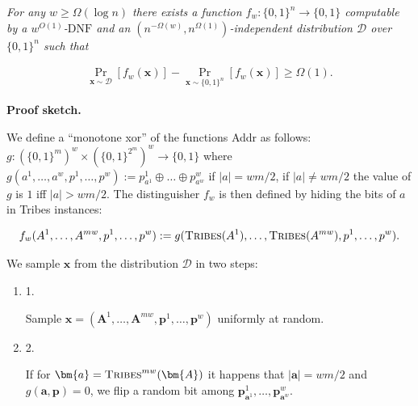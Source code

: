 \emph{For any $w\geq\Omega(\log n)$ there exists a function $f_{w}\colon\{0,1\}^{n}\to\{0,1\}$ computable by a
$w^{O(1)}$-$\mathrm{DNF}$ and an $(n^{-\Omega(w)},n^{\Omega(1)})$-independent distribution $\mathcal{D}$ over
$\{0,1\}^{n}$ such that}\par


\[\begin{gathered}
\Pr_{\bm{x}\sim\mathcal{D}}[f_{w}(\bm{x})]-\Pr_{\bm{x}\sim\{0,1\}^{n}}[f_{w}(\bm{x})]\geq\Omega(1).
\end{gathered}\]






\par\medskip\noindent\textbf{Proof sketch.}\par




We define a “monotone xor” of the functions Addr as follows:
$g\colon(\{0,1\}^{m})^{w}\times(\{0,1\}^{2^{m}})^{w}\to\{0,1\}$ where $g(a^{1},\dots,a^{w},p^{1},\dots,p^{w}):=p^{1}_{a^{1}}\oplus\dots\oplus p^{w}_{a^{w}}$ if $|a|=wm/2$, if $|a|\neq wm/2$ the value of $g$ is $1$ iff $|a|>wm/2$. The distinguisher $f_{w}$ is then defined by hiding the bits of $a$ in Tribes
instances:\par


\[\begin{gathered}
f_{w}(A^{1},\dots,A^{mw},p^{1},\dots,p^{w}):=g(\textsc{Tribes}(A^{1}),\dots,\textsc{Tribes}(A^{mw}),p^{1},\dots,p^{w}).
\end{gathered}\]




We sample $\bm{x}$ from the distribution
$\mathcal{D}$ in two steps:\par


\begin{enumerate}


\item[] 
1. 


Sample $\bm{x}=(\bm{A}^{1},\dots,\bm{A}^{mw},\bm{p}^{1},\dots,\bm{p}^{w})$ uniformly at
random.\par





\item[] 
2. 


If for $\bm{a}=\textsc{Tribes}^{mw}(\bm{A})$ it happens that $|\bm{a}|=wm/2$ and $g(\bm{a},\bm{p})=0$, we flip a random bit among $\bm{p}^{1}_{\bm{a}^{1}},\dots,\bm{p}^{w}_{\bm{a}^{w}}$.\par





\end{enumerate}




